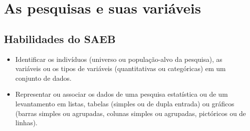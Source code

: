 \chapter{As pesquisas e suas variáveis}

\section{Habilidades do SAEB}

\begin{itemize}
\item Identificar os indivíduos (universo ou população-alvo da pesquisa),
as variáveis ou os tipos de variáveis (quantitativas ou categóricas) em 
um conjunto de dados.

\item Representar ou associar os dados de uma pesquisa estatística ou
de um levantamento em listas, tabelas (simples ou de dupla entrada) ou
gráficos (barras simples ou agrupadas, colunas simples ou agrupadas,
pictóricos ou de linhas).
\end{itemize}


